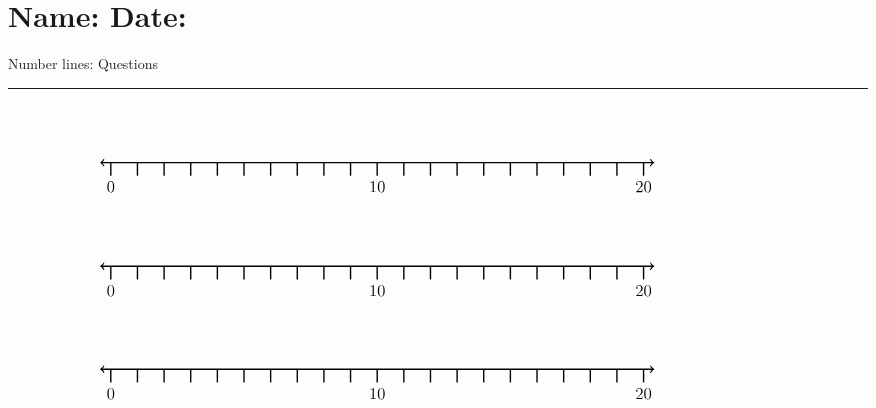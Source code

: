 \documentclass[leqno, 12pt]{article}
\def \HeadingQuestions {\section*{\Large Name: \underline{\hspace{8cm}} \hfill Date: \underline{\hspace{3cm}}} \vspace{-3mm}
{Number lines: Questions} \vspace{1pt}\hrule}
\begin{document}
  \HeadingQuestions
  \vspace{-1mm}
  \begin{equation}
    \begin{tikzpicture}[scale=0.67, baseline={([yshift=-1pt]current bounding box.north)}]
        \draw[{To[scale=1.3]}-{To[scale=1.3]}, line width=1pt] (-0.4, 0) -- (20.4, 0);
        \foreach \x in {0,1,...,20}
            \draw[shift={(\x,0)},color=black, line width=1pt] (0pt,-14pt) -- (0pt,0pt);
        \foreach \x in {0,10,20}
            \draw[shift={(\x,-0.8)},color=black] node[font=\large,text height=12pt] {$\x$};
        \node [font=\large, anchor=east] at (25,1.65) {$  $};
    \end{tikzpicture}
\end{equation}
\vspace{10pt}\begin{equation}
    \begin{tikzpicture}[scale=0.67, baseline={([yshift=-1pt]current bounding box.north)}]
        \draw[{To[scale=1.3]}-{To[scale=1.3]}, line width=1pt] (-0.4, 0) -- (20.4, 0);
        \foreach \x in {0,1,...,20}
            \draw[shift={(\x,0)},color=black, line width=1pt] (0pt,-14pt) -- (0pt,0pt);
        \foreach \x in {0,10,20}
            \draw[shift={(\x,-0.8)},color=black] node[font=\large,text height=12pt] {$\x$};
        \node [font=\large, anchor=east] at (25,1.65) {$  $};
    \end{tikzpicture}
\end{equation}
\vspace{10pt}\begin{equation}
    \begin{tikzpicture}[scale=0.67, baseline={([yshift=-1pt]current bounding box.north)}]
        \draw[{To[scale=1.3]}-{To[scale=1.3]}, line width=1pt] (-0.4, 0) -- (20.4, 0);
        \foreach \x in {0,1,...,20}
            \draw[shift={(\x,0)},color=black, line width=1pt] (0pt,-14pt) -- (0pt,0pt);
        \foreach \x in {0,10,20}
            \draw[shift={(\x,-0.8)},color=black] node[font=\large,text height=12pt] {$\x$};
        \node [font=\large, anchor=east] at (25,1.65) {$  $};
    \end{tikzpicture}
\end{equation}
\end{document}
